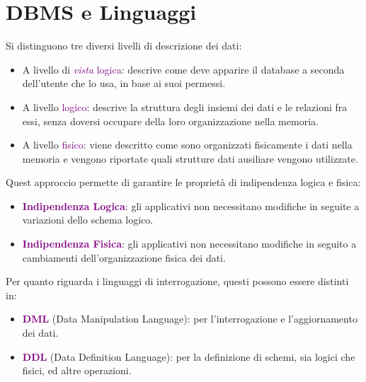 \section{DBMS e Linguaggi}
Si distinguono tre diversi livelli di descrizione dei dati:
\begin{itemize}
    \item A livello di \textcolor{purple}{\emph{vista} logica}: descrive come deve apparire il database a seconda dell'utente che lo usa, in base ai suoi permessi.
    \item A livello \textcolor{purple}{logico}: descrive la struttura degli insiemi dei dati e le relazioni fra essi,
        senza doversi occupare della loro organizzazione nella memoria.
    \item A livello \textcolor{purple}{fisico}: viene descritto come sono organizzati fisicamente i dati nella memoria e
        vengono riportate quali strutture dati ausiliare vengono utilizzate.
\end{itemize}

\begin{center}
\end{center}

Quest approccio permette di garantire le proprietà di indipendenza logica e fisica:
\begin{itemize}
    \item \textbf{\textcolor{purple}{Indipendenza Logica}}: gli applicativi non necessitano modifiche in seguite a variazioni dello schema logico.
    \item \textbf{\textcolor{purple}{Indipendenza Fisica}}: gli applicativi non necessitano modifiche in seguito a cambiamenti dell'organizzazione fisica dei dati.
\end{itemize}

Per quanto riguarda i linguaggi di interrogazione, questi possono essere distinti in:
\begin{itemize}
    \item \textbf{\textcolor{purple}{DML}} (Data Manipulation Language): per l'interrogazione e l'aggiornamento dei dati.
    \item \textbf{\textcolor{purple}{DDL}} (Data Definition Language): per la definizione di schemi, sia logici che fisici, ed altre operazioni. 
\end{itemize}

